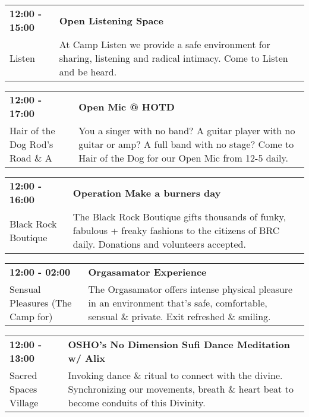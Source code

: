 \begin{tabular}{ p{1in} p{2.2in} }
    \textbf{12:00 - 15:00} & \textbf{Open Listening Space} \\
    Listen \newline  & At Camp Listen we provide a safe environment for sharing, listening and radical intimacy. Come to Listen and be heard. \\
    \hline 
\end{tabular}
    
\begin{tabular}{ p{1in} p{2.2in} }
    \textbf{12:00 - 17:00} & \textbf{Open Mic @ HOTD} \\
    Hair of the Dog \newline Rod's Road \& A & You a singer with no band? A guitar player with no guitar or amp? A full band with no stage? Come to Hair of the Dog for our Open Mic from 12-5 daily. \\
    \hline 
\end{tabular}
    
\begin{tabular}{ p{1in} p{2.2in} }
    \textbf{12:00 - 16:00} & \textbf{Operation Make a burners day} \\
    Black Rock Boutique \newline  & The Black Rock Boutique gifts thousands of funky, fabulous + freaky fashions to the citizens of BRC daily.  Donations and volunteers accepted. \\
    \hline 
\end{tabular}
    
\begin{tabular}{ p{1in} p{2.2in} }
    \textbf{12:00 - 02:00} & \textbf{Orgasamator Experience} \\
    Sensual Pleasures (The Camp for) \newline  & The Orgasamator offers intense physical pleasure in an environment that's safe, comfortable, sensual \& private.  Exit refreshed \& smiling. \\
    \hline 
\end{tabular}
    
\begin{tabular}{ p{1in} p{2.2in} }
    \textbf{12:00 - 13:00} & \textbf{OSHO's No Dimension Sufi Dance Meditation w/ Alix } \\
    Sacred Spaces Village \newline  & Invoking dance \& ritual to connect with the divine. Synchronizing our movements, breath \& heart beat to become conduits of this Divinity. \\
    \hline 
\end{tabular}
    
